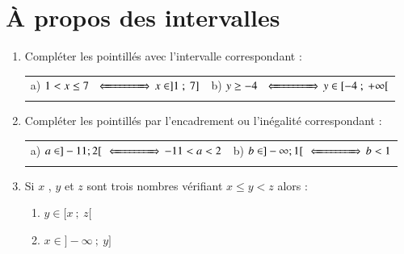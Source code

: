 \documentclass[oneside,12pt]{exam}          %
\begin{document}
\section{À propos des intervalles}
\begin{enumerate}[itemsep = 2mm]
	\item Compléter les pointillés avec l'intervalle correspondant : 
	
	\begin{tabular}{p{} p{}}
		a) $1 < x \leq 7 \, \ssi{15mm}\,  x \in ]1 ~;~7]$ &
		b) $y \geq -4 \, \ssi{15mm}\,  y \in [-4 ~;~ +\infty[$ 
	\end{tabular}
	
	\item Compléter les pointillés par l'encadrement ou l'inégalité correspondant  : 

	\begin{tabular}{p{} p{}}
		a) $a \in ]-11 ; 2[ \, \ssi{15mm}\, -11 < a < 2$ &
		b) $b \in ]-\infty ; 1[ \, \ssi{15mm}\, b < 1$
	\end{tabular}
	
	\item Si $x$ , $y$ et $z$ sont trois nombres vérifiant $x \leq y < z$ alors :
	\begin{enumerate}
		\item $y \in [x  ~;~ z[$
		\item $x \in ]-\infty ~;~ y]$
	\end{enumerate}
\end{enumerate}
\end{document}
